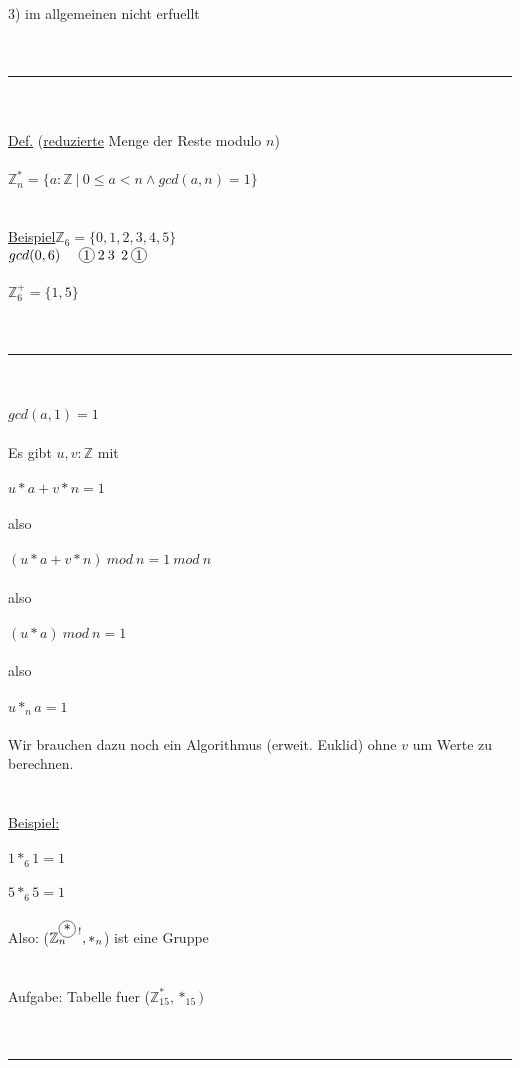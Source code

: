 \documentclass[18pt,a4paper]{article}
\newcommand*\circled[1]{\tikz[baseline=(char.base)]{
            \node[shape=circle,draw,inner sep=1pt] (char) {#1};}}
\newcommand{\tab}{\hspace*{2em}}
\begin{document}
\\
3) im allgemeinen nicht erfuellt\\
\\
\\
\rule{\textwidth}{0.4mm}\\
\\
\uline{Def.} (\uline{reduzierte} Menge der Reste modulo $n$)\\
\\
\tab $\mathbb{Z}_{n}^{*} = \{ a:\mathbb{Z}\:\vert\: 0 \leqslant a< n \wedge gcd(a,n) = 1\}$\\
\\
\\
\uline{Beispiel}\tab $\mathbb{Z}_6 = \{0,1,2,3,4,5\}$ \\
\tab \tab $gcd(0,6)\:\:\:\:\:\: \circled{1}\: 2\: 3\:\: 2\: \circled{1}$\\
\\
\tab \tab $\mathbb{Z}_{6}^{+} = \{1,5\}$\\
\\
\\
\rule{\textwidth}{0.4mm}\\
\\
$gcd(a,1) = 1$\\
\\
Es gibt $u,v : \mathbb{Z}$ mit\\
\\
\tab $u*a + v*n =1$\\
\\
also\\
\\
\tab $(u*a + v*n)\: mod\: n =1 \: mod \: n$\\
\\
also\\
\\
\tab $(u*a)\: mod\: n =1$\\
\\
also\\
\\
\tab $u *_n a =1$\\
\\
Wir brauchen dazu noch ein Algorithmus (erweit. Euklid) ohne $v$ um Werte zu berechnen.\\
\\
\\
\uline{Beispiel:}\\
\\
$1 *_6 1 =1$\\
\\
$5 *_6 5 =1$\\
\\
Also: ($\mathbb{Z}_{n}^{\circled{*}\:!}, *_n$) ist eine Gruppe\\
\\
\\
Aufgabe: Tabelle fuer ($\mathbb{Z}_{15}^{*}, *_{15})$\\
\\
\\
\rule{\textwidth}{0.4mm}\\
\\
\end{document}
